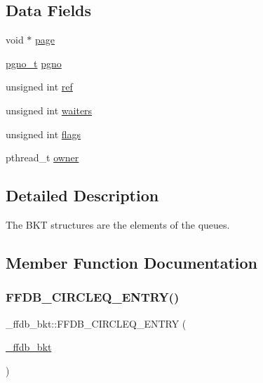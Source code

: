 \subsection*{Data Fields}
\begin{DoxyCompactItemize}
\item 
void $\ast$ \mbox{\hyperlink{struct__ffdb__bkt_a5c623f6c2692d38cfb1b020d554210ca}{page}}
\item 
\mbox{\hyperlink{adat-devel_2other__libs_2filedb_2filehash_2ffdb__db_8h_a000813331643d38481142bcce7de1501}{pgno\+\_\+t}} \mbox{\hyperlink{struct__ffdb__bkt_ab5accdaea39ef0c2afcbd420f46ff170}{pgno}}
\item 
unsigned int \mbox{\hyperlink{struct__ffdb__bkt_ae27dcd0825bacac9b31bdba869b70cac}{ref}}
\item 
unsigned int \mbox{\hyperlink{struct__ffdb__bkt_a3bfeeda182190ed60dbf8f46dcf64630}{waiters}}
\item 
unsigned int \mbox{\hyperlink{struct__ffdb__bkt_ab5210b13b17bfddd60495e09cce20e31}{flags}}
\item 
pthread\+\_\+t \mbox{\hyperlink{struct__ffdb__bkt_a7c745c3cbd09f67b3e5eef745ab4951f}{owner}}
\end{DoxyCompactItemize}


\subsection{Detailed Description}
The B\+KT structures are the elements of the queues. 

\subsection{Member Function Documentation}
\mbox{\label{struct__ffdb__bkt_a0ca6bc2cc68e6384b4b475c41a07fcea}} 
\subsubsection{\texorpdfstring{FFDB\_CIRCLEQ\_ENTRY()}{FFDB\_CIRCLEQ\_ENTRY()}\hspace{0.1cm}{\footnotesize\ttfamily [1/4]}}
{\footnotesize\ttfamily \+\_\+ffdb\+\_\+bkt\+::\+F\+F\+D\+B\+\_\+\+C\+I\+R\+C\+L\+E\+Q\+\_\+\+E\+N\+T\+RY (\begin{DoxyParamCaption}\item[{\mbox{\hyperlink{struct__ffdb__bkt}{\+\_\+ffdb\+\_\+bkt}}}]{ }\end{DoxyParamCaption})}

